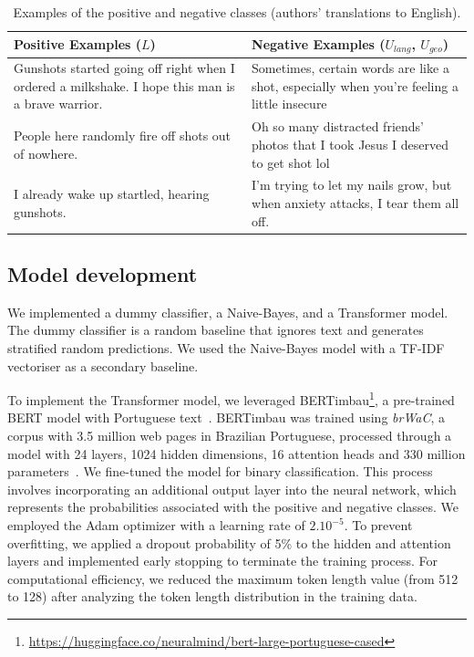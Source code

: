 \documentclass[11pt,letterpaper]{article}
\begin{document}
\begin{table}[ht]
  \centering
  \caption{Examples of the positive and negative classes (authors' translations to English).}
  \label{table:samples}
  \begin{tabular}{p{}p{}}
    \toprule
    \textbf{Positive Examples ($L$)} & \textbf{Negative Examples ($U_{lang}$, $U_{geo}$)}\\
    \midrule
    Gunshots started going off right when I ordered a milkshake. I hope this man is a brave warrior. & Sometimes, certain words are like a shot, especially when you're feeling a little insecure \\  
    \midrule
    People here randomly fire off shots out of nowhere. & Oh so many distracted friends' photos that I took Jesus I deserved to get shot lol \\
    \midrule
    I already wake up startled, hearing gunshots. & I'm trying to let my nails grow, but when anxiety attacks, I tear them all off.\\
    \bottomrule
  \end{tabular}
  \vspace{0.5cm}
\end{table}

\subsection{Model development}
\label{subsec:model-development}
We implemented a dummy classifier, a Naive-Bayes, and a Transformer model. The dummy classifier is a random baseline that ignores text and generates stratified random predictions. We used the Naive-Bayes model with a TF-IDF vectoriser as a secondary baseline.

To implement the Transformer model, we leveraged BERTimbau\footnote{\href{https://huggingface.co/neuralmind/bert-large-portuguese-cased}{https://huggingface.co/neuralmind/bert-large-portuguese-cased}}, a pre-trained BERT model with Portuguese text~\citep{souzaBERTimbauPretrainedBERT2020}. BERTimbau was trained using \textit{brWaC}, a corpus with 3.5 million web pages in Brazilian Portuguese, processed through a model with 24 layers, 1024 hidden dimensions, 16 attention heads and 330 million parameters~\citep{wagnerfilhoBrWaCCorpusNew2018,souzaBERTimbauPretrainedBERT2020}. We fine-tuned the model for binary classification. This process involves incorporating an additional output layer into the neural network, which represents the probabilities associated with the positive and negative classes. We employed the Adam optimizer with a learning rate of $2.10^{-5}$. To prevent overfitting, we applied a dropout probability of 5\% to the hidden and attention layers and implemented early stopping to terminate the training process. For computational efficiency, we reduced the maximum token length value (from 512 to 128) after analyzing the token length distribution in the training data. 
\end{document}
